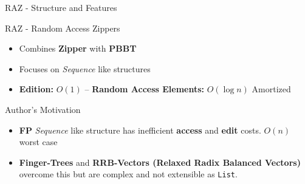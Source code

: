 \documentclass{beamer}
\begin{document}
\begin{frame}[fragile]{RAZ - Structure and Features}

  \begin{block}{RAZ - Random Access Zippers}
    \begin{itemize}
      \item Combines \textbf{Zipper} with \textbf{PBBT}
      \item Focuses on \textit{Sequence} like structures
      \item \textbf{Edition:} $O(1)$ -- \textbf{Random Access Elements:} $O(\log{n})$ Amortized
    \end{itemize}
  \end{block}

   \begin{block}{Author's Motivation}
    \begin{itemize}
      \item \textbf{FP} \textit{Sequence} like structure has inefficient \textbf{access} and \textbf{edit} costs. $O(n)$ worst case
      \item \textbf{Finger-Trees} and \textbf{RRB-Vectors (Relaxed Radix Balanced Vectors)} overcome this but are complex and not extensible as \texttt{List}.
    \end{itemize}
  \end{block}

\end{frame}
\end{document}
